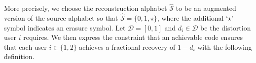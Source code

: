 More precisely, we choose the reconstruction alphabet $\mathcal{\hat{S}}$ to be an augmented version of the source alphabet so that $\mathcal{\hat{S}} = \{0, 1, \star\}$, where the additional `$\star$' symbol indicates an erasure symbol.  Let $\mathcal{D} = [0,1]$ and $d_i \in \mathcal{D}$ be the distortion user $i$ requires.  We then express the constraint that an achievable code ensures that each user $i \in \{1, 2\}$ achieves a fractional recovery of $1 - d_{i}$ with the following definition.




